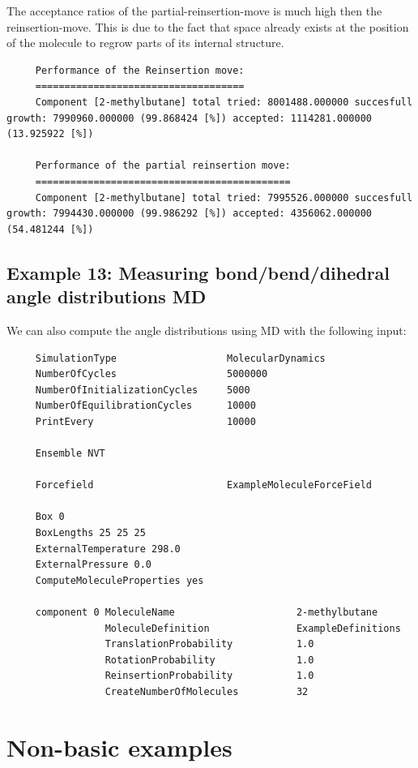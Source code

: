 The acceptance ratios of the partial-reinsertion-move is much high then the reinsertion-move.
This is due to the fact that space already exists at the position of the molecule to regrow parts of its internal structure.
\begin{tiny}
\begin{verbatim}
     Performance of the Reinsertion move:
     ====================================
     Component [2-methylbutane] total tried: 8001488.000000 succesfull growth: 7990960.000000 (99.868424 [%]) accepted: 1114281.000000 (13.925922 [%])
     
     Performance of the partial reinsertion move:
     ============================================
     Component [2-methylbutane] total tried: 7995526.000000 succesfull growth: 7994430.000000 (99.986292 [%]) accepted: 4356062.000000 (54.481244 [%])
\end{verbatim}
\end{tiny}

\subsection*{Example 13: Measuring bond/bend/dihedral angle distributions MD}

We can also compute the angle distributions using MD with the following input:
\begin{tiny}
\begin{verbatim}
     SimulationType                   MolecularDynamics
     NumberOfCycles                   5000000
     NumberOfInitializationCycles     5000
     NumberOfEquilibrationCycles      10000
     PrintEvery                       10000
     
     Ensemble NVT
     
     Forcefield                       ExampleMoleculeForceField
     
     Box 0
     BoxLengths 25 25 25
     ExternalTemperature 298.0
     ExternalPressure 0.0
     ComputeMoleculeProperties yes
     
     component 0 MoleculeName                     2-methylbutane
                 MoleculeDefinition               ExampleDefinitions
                 TranslationProbability           1.0
                 RotationProbability              1.0
                 ReinsertionProbability           1.0
                 CreateNumberOfMolecules          32
\end{verbatim}
\end{tiny}

\section{Non-basic examples}
